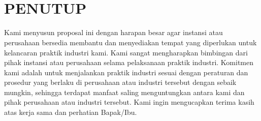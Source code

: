 \chapter[PENUTUP]{\\ PENUTUP}

Kami menyusun proposal ini dengan harapan besar agar instansi atau perusahaan bersedia membantu dan menyediakan tempat yang diperlukan untuk kelancaran praktik industri kami. Kami sangat mengharapkan bimbingan dari pihak instansi atau perusahaan selama pelaksanaan praktik industri. Komitmen kami adalah untuk menjalankan praktik industri sesuai dengan peraturan dan prosedur yang berlaku di perusahaan atau industri tersebut dengan sebaik mungkin, sehingga terdapat manfaat saling menguntungkan antara kami dan pihak perusahaan atau industri tersebut. Kami ingin mengucapkan terima kasih atas kerja sama dan perhatian Bapak/Ibu.
